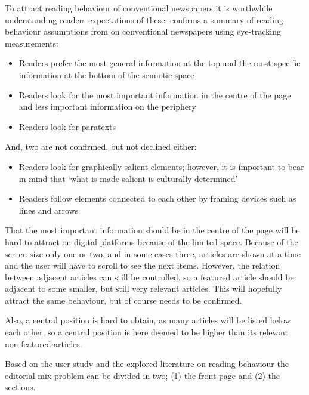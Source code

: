 To attract reading behaviour of conventional newspapers it is worthwhile understanding readers expectations of these. \cite{holsanova2006entry} confirms a summary of reading behaviour assumptions from \cite{kress1999reading} on conventional newspapers using eye-tracking measurements:
\begin{itemize}\itemdist
	\item Readers prefer the most general information at the top and the most specific information at the bottom of the semiotic space
	\item Readers look for the most important information in the centre of the page and less important information on the periphery
	\item Readers look for paratexts
\end{itemize}

And, two are not confirmed, but not declined either:
\begin{itemize}\itemdist
	\item Readers look for graphically salient elements; however, it is important to bear in mind that `what is made salient is culturally determined' \cite{kress1999reading}
	\item Readers follow elements connected to each other by framing devices such as lines and arrows
\end{itemize}

That the most important information should be in the centre of the page will be hard to attract on digital platforms because of the limited space. Because of the screen size only one or two, and in some cases three, articles are shown at a time and the user will have to scroll to see the next items. However, the relation between adjacent articles can still be controlled, so a featured article should be adjacent to some smaller, but still very relevant articles. This will hopefully attract the same behaviour, but of course needs to be confirmed.

Also, a central position is hard to obtain, as many articles will be listed below each other, so a central position is here deemed to be higher than its relevant non-featured articles.

\clearpage
Based on the user study and the explored literature on reading behaviour the editorial mix problem can be divided in two; (1) the front page and (2) the sections.

